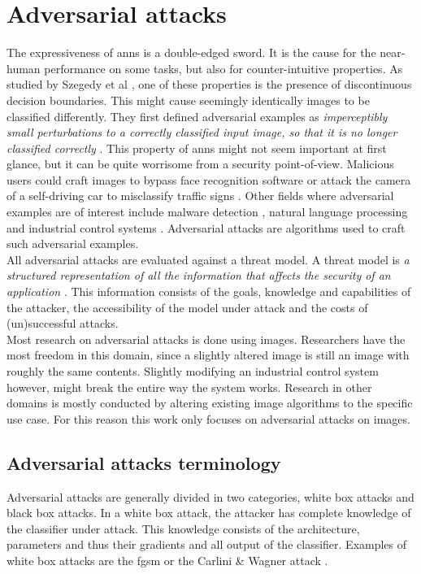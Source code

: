 \section{Adversarial attacks}
The expressiveness of \glspl{ann} is a double-edged sword. It is the cause for the near-human performance on some tasks, but also for counter-intuitive properties. As studied by Szegedy et al \cite{szegedy2014intriguing}, one of these properties is the presence of discontinuous decision boundaries. This might cause seemingly identically images to be classified differently. They first defined adversarial examples as \textit{imperceptibly small perturbations to a correctly classified input image, so that it is no longer classified correctly} \cite{szegedy2014intriguing}. This property of \glspl{ann} might not seem important at first glance, but it can be quite worrisome from a security point-of-view. Malicious users could craft images to bypass face recognition software \cite{face_recognition} or attack the camera of a self-driving car to misclassify traffic signs \cite{traffic_signs}. Other fields where adversarial examples are of interest include malware detection \cite{malware_detection}, natural language processing \cite{adversarial_nlp} and industrial control systems \cite{adversarial_industrial_control_system}. Adversarial attacks are algorithms used to craft such adversarial examples.\\ 

All adversarial attacks are evaluated against a threat model. A threat model is \textit{a structured representation of all the information that affects the security of an application} \cite{threat_model}. This information consists of the goals, knowledge and capabilities of the attacker, the accessibility of the model under attack and the costs of (un)successful attacks.\\

Most research on adversarial attacks is done using images. Researchers have the most freedom in this domain, since a slightly altered image is still an image with roughly the same contents. Slightly modifying an industrial control system however, might break the entire way the system works. Research in other domains is mostly conducted by altering existing image algorithms to the specific use case. For this reason this work only focuses on adversarial attacks on images.\\ 


\subsection{Adversarial attacks terminology}
Adversarial attacks are generally divided in two categories, white box attacks and black box attacks. In a white box attack, the attacker has complete knowledge of the classifier under attack. This knowledge consists of the architecture, parameters and thus their gradients and all output of the classifier. Examples of white box attacks are the \gls{fgsm} \cite{FGSM} or the Carlini \& Wagner attack \cite{cw_attack}.\\


